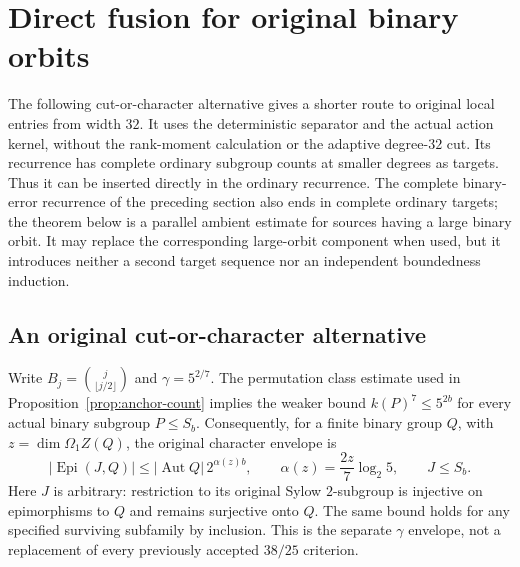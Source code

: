 \section{Direct fusion for original binary orbits}
\label{sec:binary-original-fusion}
The following cut-or-character alternative gives a shorter route to
original local entries from width $32$. It uses the deterministic
separator and the actual action kernel, without the rank-moment
calculation or the adaptive degree-$32$ cut. Its recurrence has complete
ordinary subgroup counts at smaller degrees as targets. Thus it can be
inserted directly in the ordinary recurrence. The complete binary-error
recurrence of the preceding section also ends in complete ordinary targets;
the theorem below is a parallel ambient estimate for sources having a large
binary orbit. It may replace the corresponding large-orbit component when
used, but it introduces neither a second target sequence nor an independent
boundedness induction.

\subsection{An original cut-or-character alternative}

Write $B_j=\binom{j}{\lfloor j/2\rfloor}$ and
$\gamma=5^{2/7}$. The permutation class estimate used in Proposition~\ref{prop:anchor-count}
implies the weaker bound $k(P)^7\leq5^{2b}$ for every actual binary
subgroup $P\leq S_b$.
Consequently, for a finite binary group $Q$, with
$z=\dim\Omega_1Z(Q)$, the original character envelope is
\begin{equation}\label{eq:binary-seven-original-envelope}
 |\operatorname{Epi}(J,Q)|
 \leq |\operatorname{Aut}Q|\,2^{\alpha(z)b},
 \qquad \alpha(z)=\frac{2z}{7}\log_2 5,
 \qquad J\leq S_b.
\end{equation}
Here $J$ is arbitrary: restriction to its original Sylow $2$-subgroup
is injective on epimorphisms to $Q$ and remains surjective onto $Q$.
The same bound holds for any specified surviving subfamily by inclusion.
This is the separate $\gamma$ envelope, not a replacement of every
previously accepted $38/25$ criterion.

